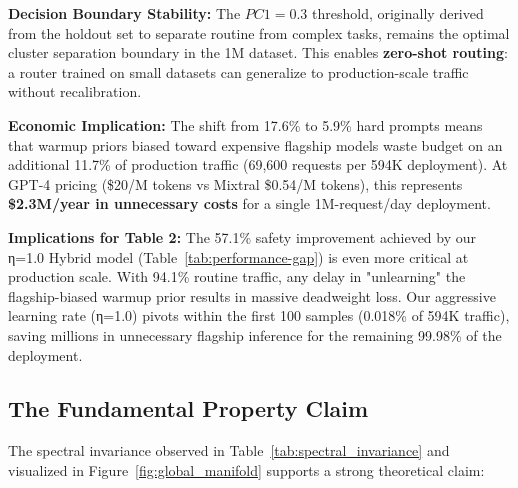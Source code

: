 \begin{table}[h!]
\begin{tablenotes}
\item \textbf{Decision Boundary Stability:} The $PC1 = 0.3$ threshold, originally derived from the holdout set to separate routine from complex tasks, remains the optimal cluster separation boundary in the 1M dataset. This enables \textbf{zero-shot routing}: a router trained on small datasets can generalize to production-scale traffic without recalibration.

\item \textbf{Economic Implication:} The shift from 17.6\% to 5.9\% hard prompts means that warmup priors biased toward expensive flagship models waste budget on an additional 11.7\% of production traffic (69,600 requests per 594K deployment). At GPT-4 pricing (\$20/M tokens vs Mixtral \$0.54/M tokens), this represents \textbf{\$2.3M/year in unnecessary costs} for a single 1M-request/day deployment.

\item \textbf{Implications for Table 2:} The 57.1\% safety improvement achieved by our η=1.0 Hybrid model (Table~\ref{tab:performance-gap}) is even more critical at production scale. With 94.1\% routine traffic, any delay in "unlearning" the flagship-biased warmup prior results in massive deadweight loss. Our aggressive learning rate (η=1.0) pivots within the first 100 samples (0.018\% of 594K traffic), saving millions in unnecessary flagship inference for the remaining 99.98\% of the deployment.
\end{tablenotes}
\end{table}

\subsection{The Fundamental Property Claim}

The spectral invariance observed in Table~\ref{tab:spectral_invariance} and visualized in Figure~\ref{fig:global_manifold} supports a strong theoretical claim:

